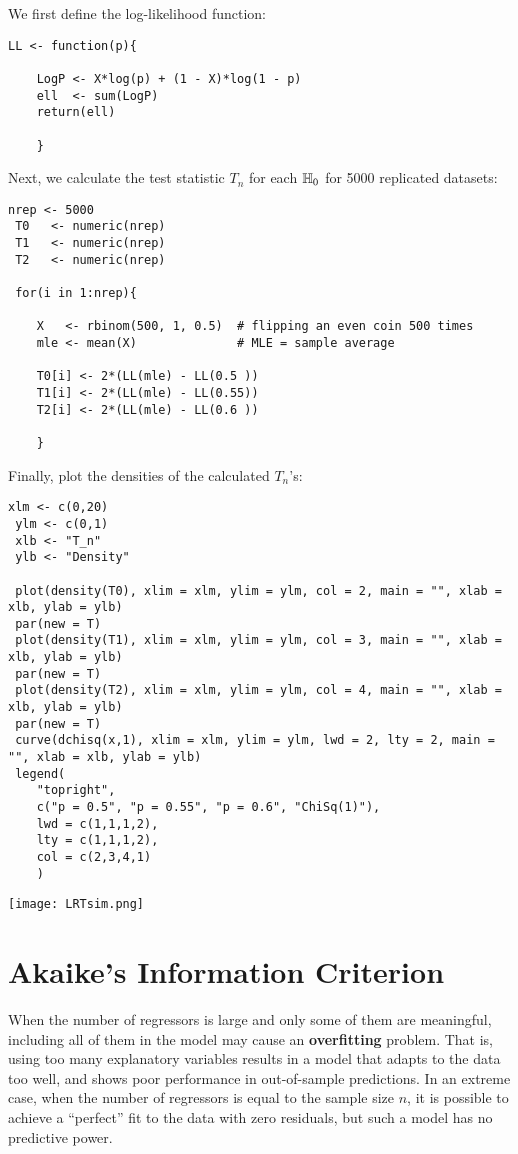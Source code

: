 \documentclass[11pt, A4paper, openany, uplatex]{book}
\begin{document}
We first define the log-likelihood function:
\begin{lstlisting}[basicstyle=\ttfamily\footnotesize, frame=single]
 LL <- function(p){ 
 
	LogP <- X*log(p) + (1 - X)*log(1 - p)
	ell  <- sum(LogP)
	return(ell)

	}
\end{lstlisting}
Next, we calculate the test statistic $T_n$ for each $\mathbb{H}_0$ for 5000 replicated datasets:
\begin{lstlisting}[basicstyle=\ttfamily\footnotesize, frame=single]
 nrep <- 5000
 T0   <- numeric(nrep)
 T1   <- numeric(nrep)
 T2   <- numeric(nrep)

 for(i in 1:nrep){

	X   <- rbinom(500, 1, 0.5)  # flipping an even coin 500 times
	mle <- mean(X)              # MLE = sample average

	T0[i] <- 2*(LL(mle) - LL(0.5 ))
	T1[i] <- 2*(LL(mle) - LL(0.55))
	T2[i] <- 2*(LL(mle) - LL(0.6 ))

	}
\end{lstlisting}
Finally, plot the densities of the calculated $T_n$'s:
\begin{lstlisting}[basicstyle=\ttfamily\scriptsize, frame=single]
 xlm <- c(0,20)
 ylm <- c(0,1)
 xlb <- "T_n"
 ylb <- "Density"
 
 plot(density(T0), xlim = xlm, ylim = ylm, col = 2, main = "", xlab = xlb, ylab = ylb)
 par(new = T)
 plot(density(T1), xlim = xlm, ylim = ylm, col = 3, main = "", xlab = xlb, ylab = ylb)
 par(new = T)
 plot(density(T2), xlim = xlm, ylim = ylm, col = 4, main = "", xlab = xlb, ylab = ylb)
 par(new = T)
 curve(dchisq(x,1), xlim = xlm, ylim = ylm, lwd = 2, lty = 2, main = "", xlab = xlb, ylab = ylb)
 legend(
	"topright",
	c("p = 0.5", "p = 0.55", "p = 0.6", "ChiSq(1)"), 
	lwd = c(1,1,1,2),
	lty = c(1,1,1,2),
	col = c(2,3,4,1)
	) 
\end{lstlisting}
\begin{center}
	\texttt{[image: LRTsim.png]}
\end{center}

\section{Akaike's Information Criterion}

When the number of regressors is large and only some of them are meaningful, including all of them in the model may cause an \textbf{overfitting} problem.
That is, using too many explanatory variables results in a model that adapts to the data too well, and shows poor performance in out-of-sample predictions.
In an extreme case, when the number of regressors is equal to the sample size $n$, it is possible to achieve a ``perfect'' fit to the data with zero residuals, but such a model has no predictive power.
\end{document}
